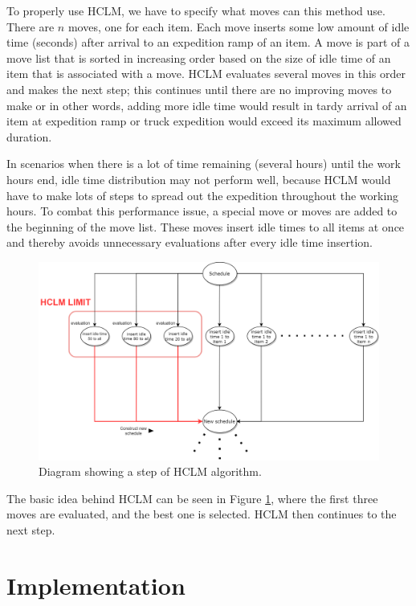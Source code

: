 \documentclass{ctuthesis}
\begin{document}
To properly use HCLM, we have to specify what moves can this method use. 
There are $n$ moves, one for each item. Each move inserts some low amount of idle time (seconds) after arrival to an expedition ramp of an item. A move is part of a move list that is sorted in increasing order based on the size of idle time of an item that is associated with a move. HCLM evaluates several moves in this order and makes the next step; this continues until there are no improving moves to make or in other words, adding more idle time would result in tardy arrival of an item at expedition ramp or truck expedition would exceed its maximum allowed duration.

 
In scenarios when there is a lot of time remaining (several hours) until the work hours end, idle time distribution may not perform well, because HCLM would have to make lots of steps to spread out the expedition throughout the working hours. To combat this performance issue, a special move or moves are added to the beginning of the move list. These moves insert idle times to all items at once and thereby avoids unnecessary evaluations after every idle time insertion.

 \begin{figure}[H]
\includegraphics[width=1\linewidth]{HCLM.png}
\caption{Diagram showing a step of HCLM algorithm.}
\label{fig:hclm}
\end{figure}

 The basic idea behind HCLM can be seen in Figure \ref{fig:hclm}, where the first three moves are evaluated, and the best one is selected. HCLM then continues to the next step. 
 
\chapter{Implementation}
\end{document}
